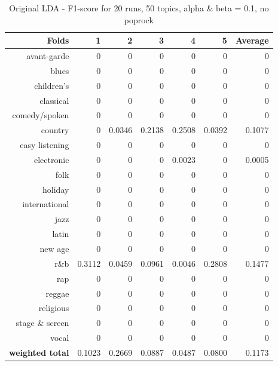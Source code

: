 \begin{table}[h]
\begin{subtable}[b]{0.8\textwidth}
\begin{tabular}{| r | r | r | r | r | r | r |}
\hline
\textbf{Folds} &  \textbf{1} & \textbf{2} & \textbf{3} & \textbf{4} & \textbf{5} & \textbf{Average}\\
\hline
avant-garde 	& 0 	& 0	 	& 0 	& 0 	& 0 	& 0\\
blues 			& 0 	& 0 	& 0 	& 0 	& 0 	& 0\\
children's 		& 0 	& 0 	& 0 	& 0 	& 0 	& 0\\
classical 		& 0 	& 0  	& 0 	& 0 	& 0 	& 0\\
comedy/spoken 	& 0 	& 0 	& 0 	& 0 	& 0	 	& 0 \\
country			& 0 	& 0.0346 & 0.2138 & 0.2508 	& 0.0392 & 0.1077 \\
easy listening 	& 0 	& 0 	& 0 	& 0 	& 0 	& 0 \\
electronic 		& 0 	& 0 	& 0 	& 0.0023 & 0 	& 0.0005\\
folk 			& 0 	& 0 	& 0 	& 0 	& 0 	& 0\\
holiday 		& 0 	& 0 	& 0 	& 0 	& 0 	& 0 \\
international 	& 0 	& 0 	& 0 	& 0 	& 0 	& 0\\
jazz 			& 0 	& 0 	& 0 	& 0 	& 0 	& 0 \\
latin 			& 0 	& 0 	& 0 	& 0 	& 0 	& 0\\
new age 		& 0 	& 0 	& 0 	& 0 	& 0 	& 0\\
r\&b 			& 0.3112 & 0.0459 & 0.0961 & 0.0046 & 0.2808 & 0.1477\\
rap 			& 0 	& 0 	& 0 	& 0 	& 0 	& 0\\
reggae 			& 0 	& 0 	& 0 	& 0 	& 0 	& 0\\
religious 		& 0 	& 0 	& 0 	& 0 	& 0 	& 0\\
stage \& screen & 0 	& 0 	& 0 	& 0 	& 0 	& 0\\
vocal 			& 0 	& 0 	& 0 	& 0 	& 0 	& 0\\
\hline
\textbf{weighted total} &  0.1023 & 0.2669 & 0.0887 & 0.0487 & 0.0800 & 0.1173\\
\hline
\end{tabular}
\caption{Original LDA - F1-score for 20 runs, 50 topics, alpha \& beta = 0.1, no poprock}
\end{subtable}
\end{table}
